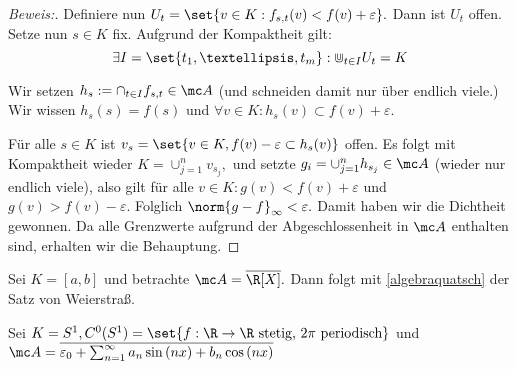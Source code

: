 \begin{theorem}
\begin{proof}[Beweis:]
		Definiere nun $U_t = \set{v \in K: f_{s, t}(v) < f(v)+\varepsilon}.$ Dann ist $U_t$ offen. Setze nun $s \in K$ fix. Aufgrund der Kompaktheit gilt: \[\exists I = \set{t_1, …, t_m}: \Cup_{t \in I}U_t = K\] 
		
		Wir setzen $h_s := \cap_{t \in I}f_{s, t} \in \mc A$ (und schneiden damit nur über endlich viele.) Wir wissen $h_s(s)=f(s)$ und $\forall v \in K: h_s(v) \subset f(v)+\varepsilon.$
		
		Für alle $s \in K$ ist $v_s = \set{v \in K, f(v)- \varepsilon \subset h_s(v)}$ offen. Es folgt mit Kompaktheit wieder $K = \cup_{j=1}^n v_{s_j},$ und setzte $g_i = \cup_{j=1}^n h_{s_j} \in \mc A$ (wieder nur endlich viele), also gilt für alle $v \in K: g(v) < f(v)+\varepsilon$ und $g(v) > f(v) -\varepsilon.$ Folglich $\norm{g-f}_{\infty} < \varepsilon.$ Damit haben wir die Dichtheit gewonnen. Da alle Grenzwerte aufgrund der Abgeschlossenheit in $\mc A$ enthalten sind, erhalten wir die Behauptung.
		
	\end{proof}
	
\end{theorem}


\begin{ex} Sei $K = [a, b]$ und betrachte $\mc A = \overline{\R[X]}.$ Dann folgt mit \ref{algebraquatsch} der Satz von Weierstraß. 
	
\end{ex}


\begin{ex} Sei $K = S^1, C^0(S^1) = \set{f: \R \to \R \text{ stetig, }2\pi \text{ periodisch}}$ und $\mc A = \overline{\varepsilon_0 + \sum_{n = 1}^{\infty}a_n \sin{(nx)} + b_n \cos{(nx)}}$
	
\end{ex}

